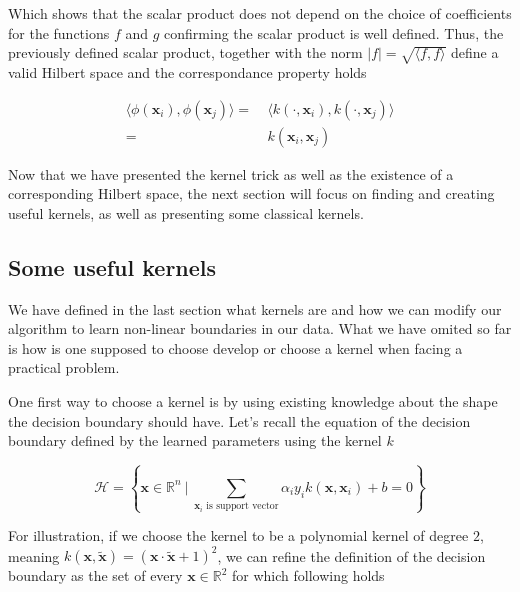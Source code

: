 Which shows that the scalar product does not depend on the choice of coefficients for the functions $f$ and $g$ confirming the scalar product is well defined. Thus, the previously defined scalar product, together with the norm $|f| = \sqrt{\langle f, f\rangle }$ define a valid Hilbert space and the correspondance property holds

\begin{equation*}
  \begin{aligned}
    \langle \phi(\mathbf{x}_i), \phi(\mathbf{x}_j)\rangle =\ &\langle k\left(\cdot, \mathbf{x}_i\right), k\left(\cdot, \mathbf{x}_j\right)\rangle \\
    =\ &k(\mathbf{x}_i, \mathbf{x}_j)
  \end{aligned}
\end{equation*}

Now that we have presented the kernel trick as well as the existence of a corresponding Hilbert space, the next section will focus on finding and creating useful kernels, as well as presenting some classical kernels.

\subsection {Some useful kernels}

We have defined in the last section what kernels are and how we can modify our algorithm to learn non-linear boundaries in our data. What we have omited so far is how is one supposed to choose develop or choose a kernel when facing a practical problem.

One first way to choose a kernel is by using existing knowledge about the shape the decision boundary should have. Let's recall the equation of the decision boundary defined by the learned parameters using the kernel $k$

\begin{equation*}
  \mathscr{H} = \left\{\mathbf{x} \in \mathbb{R}^n\ |\ \sum_{\mathbf{x}_i \text{ is support vector}}\alpha_iy_ik\left(\mathbf{x}, \mathbf{x}_i\right) + b = 0\right\}
\end{equation*}

For illustration, if we choose the kernel to be a polynomial kernel of degree $2$, meaning $k\left(\mathbf{x}, \mathbf{\tilde{x}}\right) = \left(\mathbf{x} \cdot \mathbf{\tilde{x}} + 1\right)^2$, we can refine the definition of the decision boundary as the set of every $\mathbf{x} \in \mathbb{R}^2$ for which following holds

